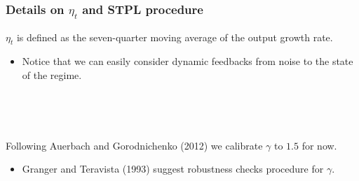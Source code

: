 \documentclass[hyperref={pdfpagelabels=false}]{beamer}
\begin{document}
\begin{frame}[label=Details]
\frametitle{Details on $\eta_t$ and STPL procedure}

$\eta_t$ is defined as the seven-quarter moving average of the output growth rate. 
\begin{itemize}
	\item Notice that we can easily consider dynamic feedbacks from noise to the state of the regime.
\end{itemize}


\

\


Following Auerbach and Gorodnichenko (2012) we calibrate $\gamma$ to $1.5$ for now.\begin{itemize}
	\item Granger and Teravista (1993) suggest robustness checks procedure for $\gamma$.
\end{itemize}

\

\



\hyperlink{STLP}{}

\end{frame}
\end{document}
